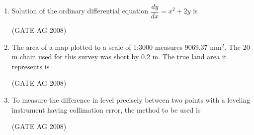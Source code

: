 \documentclass[journal,12pt,onecolumn]{IEEEtran}
\begin{document}
\begin{enumerate}
\medskip

\item 
 Solution of the ordinary differential equation $\dfrac{dy}{dx} = x^2 + 2y$ is
\begin{enumerate}
\end{enumerate}
\hfill(GATE AG 2008)\\

\medskip

\item 
 The area of a map plotted to a scale of 1:3000 measures $9069.37$ mm$^2$. The 20 m chain used for this survey was short by 0.2 m. The true land area it represents is \\
\begin{enumerate}
\end{enumerate}
\hfill(GATE AG 2008)\\

\medskip

\item 
 To measure the difference in level precisely between two points with a leveling instrument having collimation error, the method to be used is 
\begin{enumerate}
\end{enumerate}
\hfill(GATE AG 2008)\\


\end{enumerate}
\end{document}
